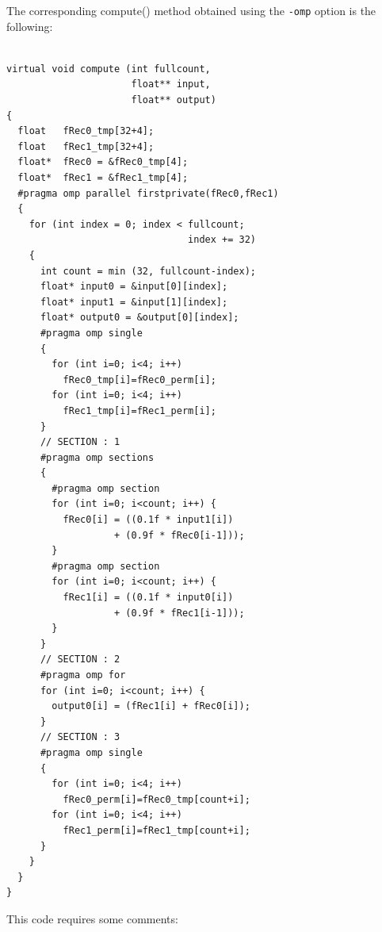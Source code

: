 The corresponding compute() method obtained using the \lstinline!-omp! option is the following:
\begin{lstlisting}

virtual void compute (int fullcount, 
                      float** input, 
                      float** output) 
{
  float   fRec0_tmp[32+4];
  float   fRec1_tmp[32+4];
  float*  fRec0 = &fRec0_tmp[4];
  float*  fRec1 = &fRec1_tmp[4];
  #pragma omp parallel firstprivate(fRec0,fRec1)
  {
    for (int index = 0; index < fullcount; 
                                index += 32) 
    {
      int count = min (32, fullcount-index);
      float* input0 = &input[0][index];
      float* input1 = &input[1][index];
      float* output0 = &output[0][index];
      #pragma omp single
      {
        for (int i=0; i<4; i++) 
          fRec0_tmp[i]=fRec0_perm[i];
        for (int i=0; i<4; i++) 
          fRec1_tmp[i]=fRec1_perm[i];
      }
      // SECTION : 1
      #pragma omp sections
      {
        #pragma omp section
        for (int i=0; i<count; i++) {
          fRec0[i] = ((0.1f * input1[i]) 
                   + (0.9f * fRec0[i-1]));
        }
        #pragma omp section
        for (int i=0; i<count; i++) {
          fRec1[i] = ((0.1f * input0[i]) 
                   + (0.9f * fRec1[i-1]));
        }
      }
      // SECTION : 2
      #pragma omp for
      for (int i=0; i<count; i++) {
        output0[i] = (fRec1[i] + fRec0[i]);
      }
      // SECTION : 3
      #pragma omp single
      {
        for (int i=0; i<4; i++) 
          fRec0_perm[i]=fRec0_tmp[count+i];
        for (int i=0; i<4; i++) 
          fRec1_perm[i]=fRec1_tmp[count+i];
      }
    }
  }
}

\end{lstlisting}

This code requires some comments:

